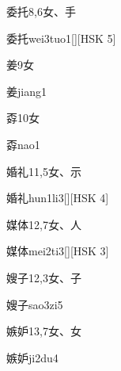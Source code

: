 \begin{entry}{委托}{8,6}{⼥、⼿}
  \begin{phonetics}{委托}{wei3tuo1}[][HSK 5]
  \end{phonetics}
\end{entry}

\begin{entry}{姜}{9}{⼥}
  \begin{phonetics}{姜}{jiang1}
  \end{phonetics}
\end{entry}

\begin{entry}{孬}{10}{⼥}
  \begin{phonetics}{孬}{nao1}
  \end{phonetics}
\end{entry}

\begin{entry}{婚礼}{11,5}{⼥、⽰}
  \begin{phonetics}{婚礼}{hun1li3}[][HSK 4]
  \end{phonetics}
\end{entry}

\begin{entry}{媒体}{12,7}{⼥、⼈}
  \begin{phonetics}{媒体}{mei2ti3}[][HSK 3]
  \end{phonetics}
\end{entry}

\begin{entry}{嫂子}{12,3}{⼥、⼦}
  \begin{phonetics}{嫂子}{sao3zi5}
  \end{phonetics}
\end{entry}

\begin{entry}{嫉妒}{13,7}{⼥、⼥}
  \begin{phonetics}{嫉妒}{ji2du4}
  \end{phonetics}
\end{entry}


